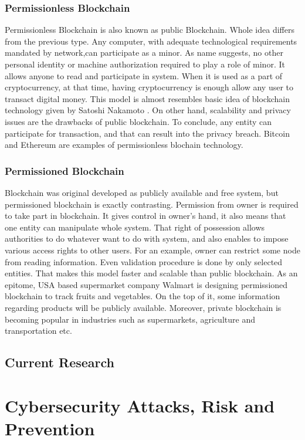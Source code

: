 \documentclass[a4paper,twoside,12pt]{report}
\begin{document}
\begin{spacing}{1.5}
\subsection{Permissionless Blockchain}
Permissionless Blockchain is also known as public Blockchain. Whole idea differs from the previous type. Any computer, with adequate technological requirements mandated by network,can participate as a minor. As name suggests, no other personal identity or machine authorization required to play a role of minor. It allows anyone to read and participate in system. When it is used as a part of cryptocurrency, at that time, having cryptocurrency is enough allow any user to transact digital money. This model is almost resembles basic idea of blockchain technology given by Satoshi Nakamoto \cite{satoshinakamoto}. On other hand, scalability and privacy issues are the drawbacks of public blockchain. To conclude, any entity can participate for transaction, and that can result into the privacy breach. Bitcoin and Ethereum are examples of permissionless blochain technology. 
\subsection{Permissioned Blockchain}
Blockchain was original developed as publicly available and free system, but permissioned blockchain is exactly contrasting. Permission from owner is required to take part in blockchain. It gives control in owner's hand, it also means that one entity can manipulate whole system. That right of possession allows authorities to do whatever want to do with system, and also enables to impose various access rights to other users. For an example, owner can restrict some node from reading information. Even validation procedure is done by only selected entities. That makes this model faster and scalable than public blockchain. As an epitome, USA based supermarket company Walmart is designing permissioned blockchain to track fruits and vegetables. On the top of it, some information regarding products will be publicly available. Moreover, private blockchain is becoming popular in industries such as supermarkets, agriculture and transportation etc.
\section{Current Research}
\cite{fangfangdai}
\chapter{Cybersecurity Attacks, Risk and Prevention}

\end{spacing}
\end{document}
